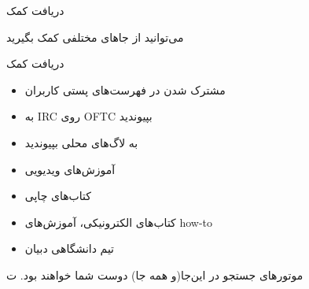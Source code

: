 \documentclass[hyperref={colorlinks}]{beamer}
\begin{document}
\begin{persian}
\begin{frame}{دریافت کمک}

می‌توانید از جاهای مختلفی کمک بگیرید

\begin{block}{دریافت کمک}
\begin{itemize}
	\item
مشترک شدن در فهرست‌های پستی کاربران	
	\item 
به IRC روی OFTC بپیوندید	
	\item 
به لاگ‌های محلی بپیوندید	
	\item 
آموزش‌های ویدیویی
	\item 
کتاب‌های چاپی	
	\item 
کتاب‌های الکترونیکی، آموزش‌های how-to	
	\item 
تیم دانشگاهی دبیان	 
\end{itemize}
\end{block}
موتورهای جستجو در این‌جا(و همه جا) دوست شما خواهند بود. ت

\end{frame}
\end{persian}

\end{document}
